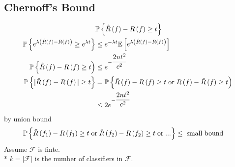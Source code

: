 \documentclass{article}
\begin{document}
\subsection{Chernoff's Bound}
\begin{align*}
&\mathbb{P}\left\{\hat{R}\left(f\right) - R\left(f\right) \geq  t\right\}
\\ \mathbb{P}\left\{e^{\lambda \left(\hat{R}\left(f\right) - R\left(f\right)\right)} \geq  e^{\lambda t}\right\} &\leq  e^{-\lambda t} \mathbb{E}\left[e^{\lambda \left(\hat{R}\left(f\right) - R\left(f\right)\right)}\right]
\\ \mathbb{P}\left\{\hat{R}\left(f\right) - R\left(f\right) \geq  t\right) &\leq  e^{- \dfrac{2 n t^{2}}{c^{2}}}
\\ \mathbb{P}\left\{| \hat{R}\left(f\right) - R\left(f\right) | \geq  t\right\} &= \mathbb{P}\left\{\hat{R}\left(f\right) - R\left(f\right) \geq  t \text{\;or\;} R\left(f\right) - \hat{R}\left(f\right) \geq  t\right)
\\ &\leq  2 e^{- \dfrac{2 n t^{2}}{c^{2}}}
\end{align*}
by union bound
\begin{align*}
\mathbb{P}\left\{ \hat{R}\left(f_{1}\right) - R\left(f_{1}\right) \geq  t \text{\;or\;} \hat{R}\left(f_{2}\right) - R\left(f_{2}\right) \geq  t \text{\;or\;} ...\right\} &\leq  \text{\;small bound\;}
\end{align*}
Assume $\mathcal{F}$ is finte.
\\* $k  = | \mathcal{F} |$ is the number of classifiers in $\mathcal{F}$.
\end{document}
